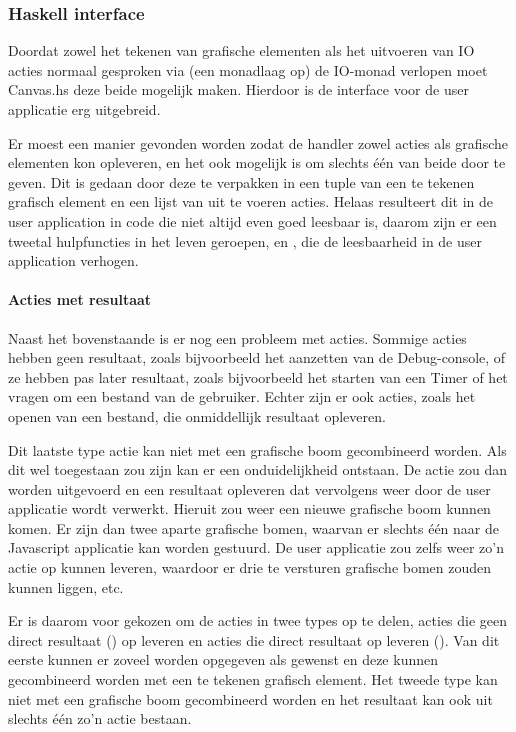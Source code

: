 \subsubsection{Haskell interface}
Doordat zowel het tekenen van grafische elementen als het uitvoeren van IO acties normaal gesproken via (een monadlaag op) de IO-monad verlopen moet Canvas.hs deze beide mogelijk maken. Hierdoor is de interface voor de user applicatie erg uitgebreid. 

Er moest een manier gevonden worden zodat de handler zowel acties als grafische elementen kon opleveren, en het ook mogelijk is om slechts één van beide door te geven. Dit is gedaan door deze te verpakken in een tuple van een te tekenen grafisch element en een lijst van uit te voeren acties. Helaas resulteert dit in de user application in code die niet altijd even goed leesbaar is, daarom zijn er een tweetal hulpfuncties in het leven geroepen,  en , die de leesbaarheid in de user application verhogen.

\paragraph{Acties met resultaat}
Naast het bovenstaande is er nog een probleem met acties. Sommige acties hebben geen resultaat, zoals bijvoorbeeld het aanzetten van de Debug-console, of ze hebben pas later resultaat, zoals bijvoorbeeld het starten van een Timer of het vragen om een bestand van de gebruiker. Echter zijn er ook acties, zoals het openen van een bestand, die onmiddellijk resultaat opleveren. 

Dit laatste type actie kan niet met een grafische boom gecombineerd worden. Als dit wel toegestaan zou zijn kan er een onduidelijkheid ontstaan. De actie zou dan worden uitgevoerd en een resultaat opleveren dat vervolgens weer door de user applicatie wordt verwerkt. Hieruit zou weer een nieuwe grafische boom kunnen komen. Er zijn dan twee aparte grafische bomen, waarvan er slechts één naar de Javascript applicatie kan worden gestuurd. De user applicatie zou zelfs weer zo'n actie op kunnen leveren, waardoor er drie te versturen grafische bomen zouden kunnen liggen, etc. 

Er is daarom voor gekozen om de acties in twee types op te delen, acties die geen direct resultaat () op leveren en acties die direct resultaat op leveren (). Van dit eerste kunnen er zoveel worden opgegeven als gewenst en deze kunnen gecombineerd worden met een te tekenen grafisch element. Het tweede type kan niet met een grafische boom gecombineerd worden en het resultaat kan ook uit slechts één zo'n actie bestaan. 


